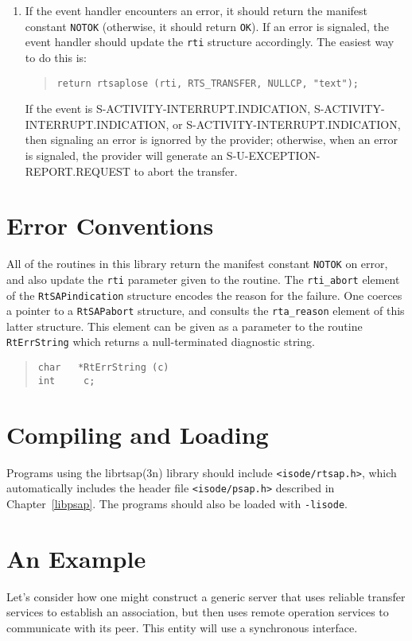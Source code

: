 \begin{enumerate}
\item	If the event handler encounters an error, it should return the
	manifest constant \verb"NOTOK" (otherwise, it should return
	\verb"OK").
	If an error is signaled, the event handler should update the
	\verb"rti" structure accordingly.  The easiest way to do this is:
\begin{quote}\small\begin{verbatim}
return rtsaplose (rti, RTS_TRANSFER, NULLCP, "text");
\end{verbatim}\end{quote}
If the event is {\sf S-ACTIVITY-INTERRUPT.INDICATION},
{\sf S-ACTIVITY-INTERRUPT.INDICATION},
or {\sf S-ACTIVITY-INTERRUPT.IN\-DI\-CA\-TION},
then signaling an error is ignorred by the provider;
otherwise, when an error is signaled, the provider will generate an
{\sf S-U-EXCEPTION-REPORT.REQUEST\/} to abort the transfer.
\end{enumerate}

\section	{Error Conventions}
All of the routines in this library return the manifest constant \verb"NOTOK"
on error,
and also update the \verb"rti" parameter given to the routine.
The \verb"rti_abort" element of the \verb"RtSAPindication" structure
encodes the reason for the failure.
One coerces a pointer to a \verb"RtSAPabort" structure,
and consults the \verb"rta_reason" element of this latter structure.
This element can be given as a
parameter to the routine \verb"RtErrString" which returns a null-terminated
diagnostic string.
\begin{quote}\small\begin{verbatim}
char   *RtErrString (c)
int     c;
\end{verbatim}\end{quote}

\section	{Compiling and Loading}
Programs using the \man librtsap(3n) library should include
\verb"<isode/rtsap.h>",
which automatically includes the header file \verb"<isode/psap.h>" described in
Chapter~\ref{libpsap}.
The programs should also be loaded with \verb"-lisode".

\section	{An Example}
Let's consider how one might construct a generic server that uses
reliable transfer services to establish an association,
but then uses remote operation services to communicate with its peer.
This entity will use a synchronous interface.

